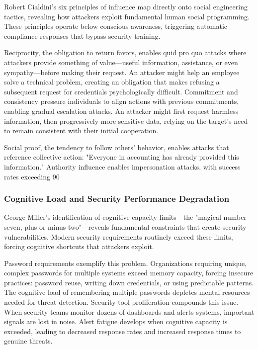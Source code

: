 \documentclass[11pt,a4paper]{article}
\begin{document}
Robert Cialdini's six principles of influence\cite{cialdini2007} map directly onto social engineering tactics, revealing how attackers exploit fundamental human social programming. These principles operate below conscious awareness, triggering automatic compliance responses that bypass security training.

Reciprocity, the obligation to return favors, enables quid pro quo attacks where attackers provide something of value—useful information, assistance, or even sympathy—before making their request. An attacker might help an employee solve a technical problem, creating an obligation that makes refusing a subsequent request for credentials psychologically difficult. Commitment and consistency pressure individuals to align actions with previous commitments, enabling gradual escalation attacks. An attacker might first request harmless information, then progressively more sensitive data, relying on the target's need to remain consistent with their initial cooperation.

Social proof, the tendency to follow others' behavior, enables attacks that reference collective action: "Everyone in accounting has already provided this information." Authority influence enables impersonation attacks, with success rates exceeding 90%

\subsubsection{Cognitive Load and Security Performance Degradation}

George Miller's identification of cognitive capacity limits\cite{miller1956}—the "magical number seven, plus or minus two"—reveals fundamental constraints that create security vulnerabilities. Modern security requirements routinely exceed these limits, forcing cognitive shortcuts that attackers exploit.

Password requirements exemplify this problem. Organizations requiring unique, complex passwords for multiple systems exceed memory capacity, forcing insecure practices: password reuse, writing down credentials, or using predictable patterns. The cognitive load of remembering multiple passwords depletes mental resources needed for threat detection. Security tool proliferation compounds this issue. When security teams monitor dozens of dashboards and alerts systems, important signals are lost in noise. Alert fatigue develops when cognitive capacity is exceeded, leading to decreased response rates and increased response times to genuine threats.
\end{document}
